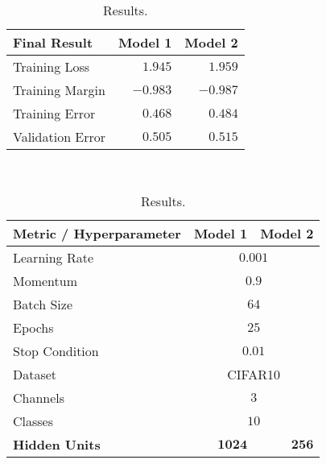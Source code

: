 \documentclass[11pt, reqno]{amsart}
\begin{document}
  \step
    \begin{table}[h]
      \begin{minipage}{.4\textwidth}
        \centering
        \begin{tabular}{| l | r | r |}
          \bottomrule
          Final Result                & Model 1     & Model 2 \\   
          \midrule
          Training Loss               & $1.945$     & $1.959$ \\
          Training Margin             & $-0.983$    & $-0.987$ \\
          Training Error              & $0.468$     & $0.484$	 \\
          Validation Error            & $0.505$     & $0.515$ \\
          \toprule
        \end{tabular}
        \caption{Results.}~\label{tab:results}
      \end{minipage}%
      \begin{minipage}{.6\textwidth}
        \centering
        \begin{tabular}{| l | r | r |}
          \bottomrule
          Metric / Hyperparameter   & Model 1     & Model 2 \\
          \midrule
          Learning Rate             & \multicolumn{2}{c|}{$0.001$}                                    \\ 
          Momentum                  & \multicolumn{2}{c|}{$0.9$}                                      \\ 
          Batch Size                & \multicolumn{2}{c|}{$64$}                                       \\ 
          Epochs                    & \multicolumn{2}{c|}{$25$}                                       \\ 
          Stop Condition            & \multicolumn{2}{c|}{$0.01$}                                     \\
          Dataset                   & \multicolumn{2}{c|}{CIFAR10}                                    \\
          Channels                  & \multicolumn{2}{c|}{$3$}                                        \\
          Classes                   & \multicolumn{2}{c|}{$10$}                                       \\
          \midrule
          \textbf{Hidden Units}     & $\mathbf{1024}$                     & $\mathbf{256}$                      \\

\end{tabular}
\end{minipage}
\end{table}
\end{document}
